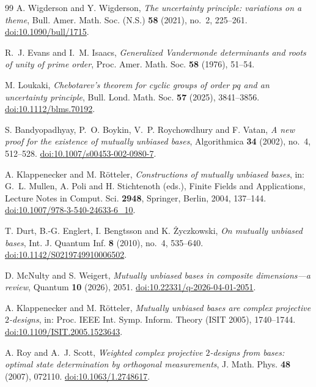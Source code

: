 \documentclass[11pt]{article}
\begin{document}
\begin{thebibliography}{99}
A. Wigderson and Y. Wigderson,
\emph{The uncertainty principle: variations on a theme},
Bull. Amer. Math. Soc. (N.S.) \textbf{58} (2021), no.~2, 225--261.
\href{https://doi.org/10.1090/bull/1715}{doi:10.1090/bull/1715}.

R.~J. Evans and I.~M. Isaacs,
\emph{Generalized Vandermonde determinants and roots of unity of prime order},
Proc. Amer. Math. Soc. \textbf{58} (1976), 51--54.

M. Loukaki,
\emph{Chebotarev's theorem for cyclic groups of order $pq$ and an uncertainty principle},
Bull. Lond. Math. Soc. \textbf{57} (2025), 3841--3856.
\href{https://doi.org/10.1112/blms.70192}{doi:10.1112/blms.70192}.

S. Bandyopadhyay, P.~O. Boykin, V.~P. Roychowdhury and F. Vatan,
\emph{A new proof for the existence of mutually unbiased bases},
Algorithmica \textbf{34} (2002), no.~4, 512--528.
\href{https://doi.org/10.1007/s00453-002-0980-7}{doi:10.1007/s00453-002-0980-7}.

A. Klappenecker and M. R\"otteler,
\emph{Constructions of mutually unbiased bases},
in: G.~L. Mullen, A. Poli and H. Stichtenoth (eds.),
Finite Fields and Applications, Lecture Notes in Comput. Sci. \textbf{2948},
Springer, Berlin, 2004, 137--144.
\href{https://doi.org/10.1007/978-3-540-24633-6_10}{doi:10.1007/978-3-540-24633-6\_10}.

T. Durt, B.-G. Englert, I. Bengtsson and K. \ifmmode{}\else\.Z\fi yczkowski,
\emph{On mutually unbiased bases},
Int. J. Quantum Inf. \textbf{8} (2010), no.~4, 535--640.
\href{https://doi.org/10.1142/S0219749910006502}{doi:10.1142/S0219749910006502}.

D. McNulty and S. Weigert,
\emph{Mutually unbiased bases in composite dimensions---a review},
Quantum \textbf{10} (2026), 2051.
\href{https://doi.org/10.22331/q-2026-04-01-2051}{doi:10.22331/q-2026-04-01-2051}.

A. Klappenecker and M. R\"otteler,
\emph{Mutually unbiased bases are complex projective $2$-designs},
in: Proc. IEEE Int. Symp. Inform. Theory (ISIT 2005), 1740--1744.
\href{https://doi.org/10.1109/ISIT.2005.1523643}{doi:10.1109/ISIT.2005.1523643}.

A. Roy and A.~J. Scott,
\emph{Weighted complex projective $2$-designs from bases: optimal state determination by orthogonal measurements},
J. Math. Phys. \textbf{48} (2007), 072110.
\href{https://doi.org/10.1063/1.2748617}{doi:10.1063/1.2748617}.


\end{thebibliography}
\end{document}
